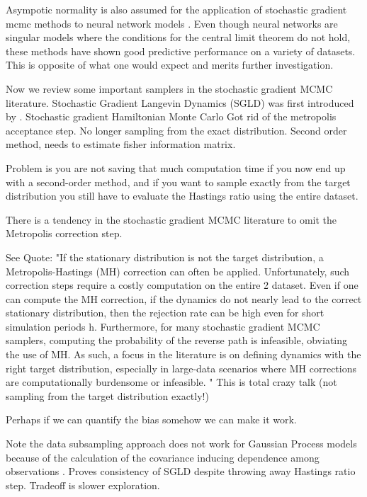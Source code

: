 \documentclass[]{report}
\begin{document}
Asympotic normality is also assumed for the application of stochastic gradient mcmc methods to neural network models \cite{welling2011bayesian,chen2014stochastic,ahn2012bayesian,ding2014bayesian,ma2015complete}. Even though neural networks are singular models where the conditions for the central limit theorem do not hold, these methods have shown good predictive performance on a variety of datasets. This is opposite of what one would expect and merits further investigation.







Now we review some important samplers in the stochastic gradient MCMC
literature. Stochastic Gradient Langevin Dynamics (SGLD) was first introduced by
\cite{welling2011bayesian}. 
Stochastic gradient Hamiltonian Monte Carlo
Got rid of the metropolis acceptance step. No longer sampling from the exact
distribution. Second order method, needs to estimate fisher information matrix.

\cite{chen2014stochastic}

Problem is you are not saving that much computation time if you now end up with a second-order method, and if you want to sample exactly from the target distribution you still have to evaluate the Hastings ratio using the entire dataset.

There is a tendency in the stochastic gradient MCMC literature to omit the Metropolis correction step.

See \cite{ding2014bayesian} 
Quote: "If the stationary distribution is not the target distribution, a Metropolis-Hastings (MH) correction can often be applied. Unfortunately, such correction steps require a costly computation on the entire
2
dataset. Even if one can compute the MH correction, if the dynamics do not nearly lead to the correct stationary distribution, then the rejection rate can be high even for short simulation periods h. Furthermore, for many stochastic gradient MCMC samplers, computing the probability of the reverse path is infeasible, obviating the use of MH. As such, a focus in the literature is on defining dynamics with the right target distribution, especially in large-data scenarios where MH corrections are computationally burdensome or infeasible.
"
\cite{ma2015complete}
This is total crazy talk (not sampling from the target distribution exactly!)

Perhaps if we can quantify the bias somehow we can make it work.

Note the data subsampling approach does not work for Gaussian Process models because of the calculation of the covariance inducing dependence among observations \cite{filippone2015enabling}.
\cite{teh2014consistency}
Proves consistency of SGLD despite throwing away Hastings ratio step. Tradeoff is slower exploration.
\end{document}
